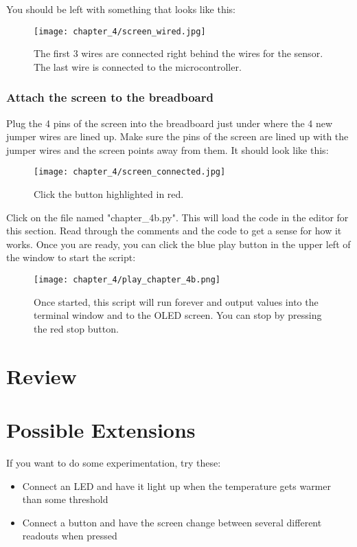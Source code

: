 You should be left with something that looks like this:
\begin{figure}[H]
    \centering
    \texttt{[image: chapter\_4/screen\_wired.jpg]}
    \caption{The first 3 wires are connected right behind the wires for the sensor. The last wire is connected to the microcontroller.}
\end{figure}

\subsubsection{Attach the screen to the breadboard}
Plug the 4 pins of the screen into the breadboard just under where the 4 new jumper wires are lined up. Make sure the pins of the screen are lined up with the jumper wires and the screen points away from them. It should look like this:

\begin{figure}[H]
    \centering
    \texttt{[image: chapter\_4/screen\_connected.jpg]}
    \caption{Click the button highlighted in red.}
\end{figure}

Click on the file named "chapter\_4b.py". This will load the code in the editor for this section. Read through the comments and the code to get a sense for how it works. Once you are ready, you can click the blue play button in the upper left of the window to start the script:

\begin{figure}[H]
    \centering
    \texttt{[image: chapter\_4/play\_chapter\_4b.png]}
    \caption{Once started, this script will run forever and output values into the terminal window and to the OLED screen. You can stop by pressing the red stop button.}
\end{figure}

\section{Review}

\section{Possible Extensions}
If you want to do some experimentation, try these:

\begin{itemize}
    \item Connect an LED and have it light up when the temperature gets warmer than some threshold
    \item Connect a button and have the screen change between several different readouts when pressed
\end{itemize}
